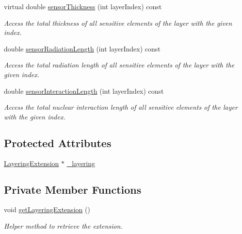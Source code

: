 \begin{DoxyCompactItemize}
virtual double \hyperlink{class_d_d4hep_1_1_d_d_rec_1_1_layered_subdetector_aa373ff4546aace1d8049e19b8ef8874f}{sensorThickness} (int layerIndex) const 
\begin{DoxyCompactList}\small\item\em Access the total thickness of all sensitive elements of the layer with the given index. \item\end{DoxyCompactList}\item 
double \hyperlink{class_d_d4hep_1_1_d_d_rec_1_1_layered_subdetector_a2b1079b698e6ed15af85e1558f893540}{sensorRadiationLength} (int layerIndex) const 
\begin{DoxyCompactList}\small\item\em Access the total radiation length of all sensitive elements of the layer with the given index. \item\end{DoxyCompactList}\item 
double \hyperlink{class_d_d4hep_1_1_d_d_rec_1_1_layered_subdetector_adbf23ebe50a26ecef9dd053b4066ed4d}{sensorInteractionLength} (int layerIndex) const 
\begin{DoxyCompactList}\small\item\em Access the total nuclear interaction length of all sensitive elements of the layer with the given index. \item\end{DoxyCompactList}\end{DoxyCompactItemize}
\subsection*{Protected Attributes}
\begin{DoxyCompactItemize}
\item 
\hyperlink{class_d_d4hep_1_1_d_d_rec_1_1_layering_extension}{LayeringExtension} $\ast$ \hyperlink{class_d_d4hep_1_1_d_d_rec_1_1_layered_subdetector_a01f66cc99e59bf522dff6c7295235692}{\_\-layering}
\end{DoxyCompactItemize}
\subsection*{Private Member Functions}
\begin{DoxyCompactItemize}
\item 
void \hyperlink{class_d_d4hep_1_1_d_d_rec_1_1_layered_subdetector_a6abda5bb466aecbc60735dabe056a0eb}{getLayeringExtension} ()
\begin{DoxyCompactList}\small\item\em Helper method to retrieve the extension. \item\end{DoxyCompactList}\end{DoxyCompactItemize}


